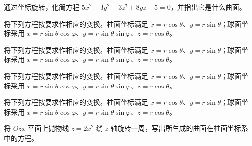 \newpage
\noindent\begin{minipage}{\textwidth}
通过坐标旋转，化简方程 $5x^2-3y^2+3z^2+8yz-5=0$，并指出它是什么曲面。
\end{minipage}\par\vfill
\noindent\begin{minipage}{\textwidth}
将下列方程按要求作相应的变换。柱面坐标满足 $x=r\cos\theta$、$y=r\sin\theta$；球面坐标采用 $x=r\sin\theta\cos\varphi$、$y=r\sin\theta\sin\varphi$、$z=r\cos\theta$。
\end{minipage}\par\vfill
\noindent\begin{minipage}{\textwidth}
将下列方程按要求作相应的变换。柱面坐标满足 $x=r\cos\theta$、$y=r\sin\theta$；球面坐标采用 $x=r\sin\theta\cos\varphi$、$y=r\sin\theta\sin\varphi$、$z=r\cos\theta$。
\end{minipage}\par\vfill
\noindent\begin{minipage}{\textwidth}
将下列方程按要求作相应的变换。柱面坐标满足 $x=r\cos\theta$、$y=r\sin\theta$；球面坐标采用 $x=r\sin\theta\cos\varphi$、$y=r\sin\theta\sin\varphi$、$z=r\cos\theta$。
\end{minipage}\par\vfill
\newpage
\noindent\begin{minipage}{\textwidth}
将下列方程按要求作相应的变换。柱面坐标满足 $x=r\cos\theta$、$y=r\sin\theta$；球面坐标采用 $x=r\sin\theta\cos\varphi$、$y=r\sin\theta\sin\varphi$、$z=r\cos\theta$。
\end{minipage}\par\vfill
\noindent\begin{minipage}{\textwidth}
将 $Ozx$ 平面上抛物线 $z=2x^2$ 绕 $z$ 轴旋转一周，写出所生成的曲面在柱面坐标系中的方程。
\end{minipage}\par\vfill
